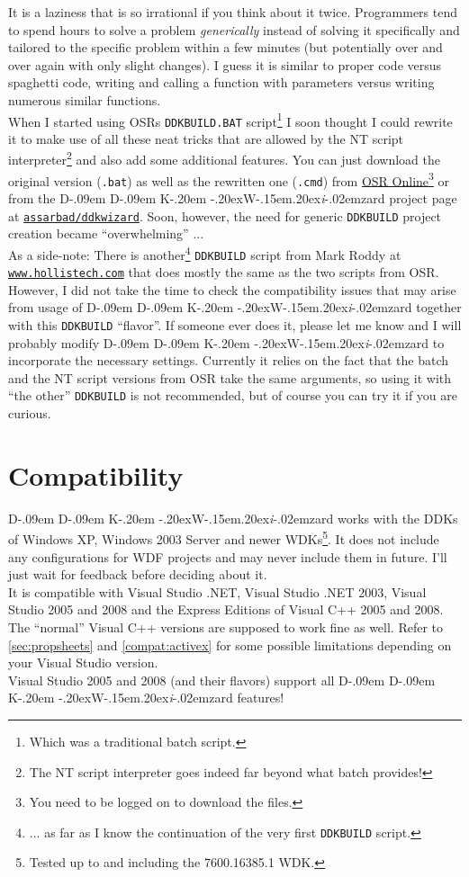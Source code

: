 \documentclass[a4paper,titlepage]{report}
\newcommand{\linkclr}[1]{\textcolor[rgb]{0.00,0.00,0.60}{#1}}
\newcommand{\extlink}[2]{\href{#1}{\linkclr{#2}}}
\newcommand{\extlinktt}[2]{\href{#1}{\texttt{\linkclr{#2}}}}
\def\ddkwiz{D\kern-.09em D\kern-.09em K\kern-.20em \raise-.20ex\hbox{W}\kern-.15em\raise.20ex\hbox{\it{i}}\kern-.02em{zard}}
\begin{document}
It is a laziness that is so irrational if you think about it twice.
Programmers tend to spend hours to solve a problem \emph{generically}\texttrademark{}
instead of solving it specifically and tailored to the specific problem within a few
minutes (but potentially over and over again with only slight changes). I guess
it is similar to proper code versus spaghetti code, writing and calling a function
with parameters versus writing numerous similar functions.\\

When I started using OSRs \texttt{DDKBUILD.BAT} script\footnote{Which was a traditional batch script.}
I soon thought I could rewrite it to make use of all these neat tricks
that are allowed by the NT script interpreter\footnote{The NT script interpreter
goes indeed far beyond what batch provides!} and also add some additional features.
You can just download the original version (\texttt{.bat}) as well as the rewritten
one (\texttt{.cmd}) from \extlink{http://www.osronline.com/article.cfm?article=43}{OSR
Online}\footnote{You need to be logged on to download the files.}
or from the \ddkwiz{} project page at \extlinktt{https://bitbucket.org/assarbad/ddkwizard}{assarbad/ddkwizard}.
Soon, however, the need for generic \texttt{DDKBUILD} project creation became ``overwhelming'' ...\\

As a side-note: There is another\footnote{... as far as I know the continuation of
the very first \texttt{DDKBUILD} script.} \texttt{DDKBUILD} script from Mark Roddy at
\extlinktt{http://www.hollistech.com}{www.hollistech.com}
that does mostly the same as the two scripts from OSR. However, I did not take the time
to check the compatibility issues that may arise from usage of \ddkwiz{} together
with this \texttt{DDKBUILD} ``flavor''. If someone ever does it, please let me know
and I will probably modify \ddkwiz{} to incorporate the necessary
settings. Currently it relies on the fact that the batch and the NT script
versions from OSR take the same arguments, so using it with ``the other''
\texttt{DDKBUILD} is not recommended, but of course you can try it if you are curious.

\section*{Compatibility}
\ddkwiz{} works with the DDKs of Windows XP, Windows 2003 Server and newer
WDKs\footnote{Tested up to and including the 7600.16385.1 WDK.}.
It does not include any configurations for WDF projects and may never include
them in future. I'll just wait for feedback before deciding about it.\\
It is compatible with Visual Studio .NET, Visual Studio .NET 2003, Visual Studio 2005
and 2008 and the Express Editions of Visual C++ 2005 and 2008. The ``normal''
Visual C++ versions are supposed to work fine as well. Refer to \autoref{sec:propsheets}
and \autoref{compat:activex} for some possible limitations depending
on your Visual Studio version.\\
Visual Studio 2005 and 2008 (and their flavors) support all \ddkwiz{} features!
\end{document}
